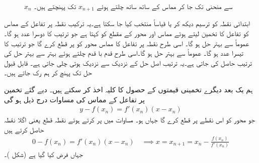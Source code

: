 \begin{figure}
\begin{minipage}{0.45\textwidth}
\caption{$x_n$ سے منحنی تک جا کر مماس کے ساتھ ساتھ چلتے ہوئے $x_{n+1}$ تک پہنچتے ہیں۔}
\label{شکل_استعمال_نیوٹن_ترکیب_الف}
\end{minipage}
\end{figure}

ابتدائی نقطہ  کو ترسیم دیکھ کر یا قیاساً منتخب کیا جا سکتا ہے۔یہ ترکیب نقطہ  پر تفاعل کے مماس کو تفاعل کا تخمین لیتے ہوئے مماس اور  محور کے مقطع کو  کہتا ہے جو ترتیب کا دوسرا عدد ہو گا۔ عموماً  سے بہتر حل ہو گا۔ اسی طرح  نقطہ  پر تفاعل کا مماس  محور  کو   پر قطع کرے گا جو ترتیب کا تیسرا عدد ہو گا۔ عموماً  سے بہتر حل ہو گا۔اسی طرح قدم با قدم چلتے ہوئے بہتر سے بہتر حل کی ترتیب حاصل کی جاتی ہے۔یہ ترتیب اصل حل کے نزدیک سے نزدیک ہوتی چلی جاتی ہے۔ قابل قبول حل تک پہنچ کر ہم رک جاتے ہیں۔ 

ہم یک بعد دیگرے تخمینی قیمتوں کے حصول کا کلیہ اخذ کر سکتے ہیں۔ دیے گئے تخمین  پر تفاعل کے مماس کی مساوات درج ذیل ہو گی
\begin{align}\label{مساوات_استعمال_نیوٹن_الف}
y-f(x_n)=f'(x_n)(x-x_n)
\end{align} 
جو محور کو اس نقطے پر قطع کرے گا جہاں  ہو۔ مساوات  میں  پر کرتے ہوئے نقطہ قطع یعنی اگلا نقطہ  حاصل کرتے ہیں
\begin{align*}
0-f(x_n)=f'(x_n)(x-x_n)\quad \implies x=x_{n+1}=x_n-\frac{f(x_n)}{f'(x_n)}
\end{align*}
 جہاں  فرض کیا گیا ہے  (شکل )۔

